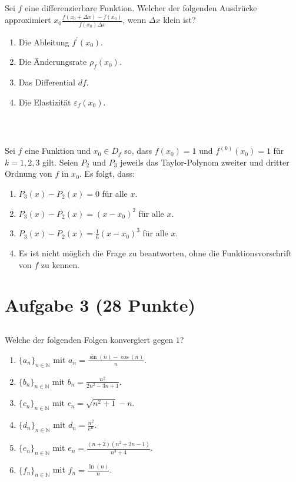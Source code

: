 \subsection*{}
Sei $f$ eine differenzierbare Funktion. Welcher der folgenden Ausdrücke approximiert 
$x_0 \frac{f(x_0 + \Delta x) - f(x_0)}{f(x_0) \Delta x}$, wenn $\Delta x$ klein ist?
\renewcommand{\labelenumi}{(\alph{enumi})}
\begin{enumerate}
	\item 
	Die Ableitung $f^\prime(x_0)$.
	\item
	Die Änderungsrate $\rho_f(x_0)$.	
	\item
    Das Differential $df$.
	\item
	Die Elastizität $\varepsilon_f(x_0)$.
\end{enumerate}
\ \\
\subsection*{}
Sei $f$ eine Funktion und $x_0 \in D_f$ so, dass $f(x_0) = 1$ und $f^{(k)}(x_0) = 1$ für $k = 1,2,3$ gilt. Seien $P_2$ und $P_3$ jeweils das Taylor-Polynom zweiter und dritter Ordnung von $f$ in $x_0$. Es folgt, dass:
\renewcommand{\labelenumi}{(\alph{enumi})}
\begin{enumerate}
	\item 
	$P_3(x) - P_2(x) = 0 $ für alle $x$.
	\item
	$P_3(x) - P_2(x) = (x - x_0)^2 $ für alle $x$.
	\item
	$P_3(x) - P_2(x) = \frac{1}{6} (x - x_0)^3 $ für alle $x$.
	\item
	Es ist nicht möglich die Frage zu beantworten, ohne die Funktionsvorschrift von $f$ zu kennen.
\end{enumerate}


\newpage
\section*{Aufgabe 3 (28 Punkte)}
\vspace{0.4cm}

\subsection*{}
Welche der folgenden Folgen konvergiert gegen $1$?
\renewcommand{\labelenumi}{(\alph{enumi})}
\begin{enumerate}
	\item 
	$ \{a_n\}_{n \in \mathbb{N}} $ mit $a_n = \frac{\sin(n) - \cos(n)}{n}$.
	\item
	$ \{b_n\}_{n \in \mathbb{N}} $ mit $b_n = \frac{n^2}{2n^2 - 3n +1 }$.
	\item
	$ \{c_n\}_{n \in \mathbb{N}} $ mit $c_n = \sqrt{n^2 + 1 }  - n$.
	\item
	$ \{d_n\}_{n \in \mathbb{N}} $ mit $d_n = \frac{n^2}{e^n}$.
	\item
	$ \{e_n\}_{n \in \mathbb{N}} $ mit $e_n = \frac{(n+2)(n^2 + 3n -1 )}{n^3 + 4 }$.
	\item
	$ \{f_n\}_{n \in \mathbb{N}} $ mit $f_n = \frac{\ln(n)}{n}$.
\end{enumerate}
\ \\

